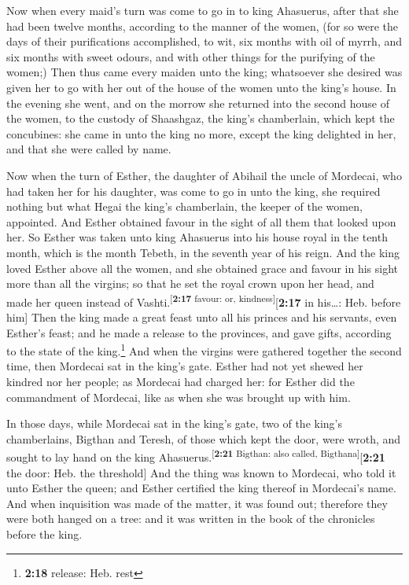  Now when every maid's turn was come to go in to king
Ahasuerus, after that she had been twelve months, according to the
manner of the women, (for so were the days of their purifications
accomplished, to wit, six months with oil of myrrh, and six months with
sweet odours, and with other things for the purifying of the women;)
 Then thus came every maiden unto the king; whatsoever
she desired was given her to go with her out of the house of the women
unto the king's house.  In the evening she went, and on
the morrow she returned into the second house of the women, to the
custody of Shaashgaz, the king's chamberlain, which kept the concubines:
she came in unto the king no more, except the king delighted in her, and
that she were called by name.

 Now when the turn of Esther, the daughter of Abihail the
uncle of Mordecai, who had taken her for his daughter, was come to go in
unto the king, she required nothing but what Hegai the king's
chamberlain, the keeper of the women, appointed. And Esther obtained
favour in the sight of all them that looked upon her.  So
Esther was taken unto king Ahasuerus into his house royal in the tenth
month, which is the month Tebeth, in the seventh year of his reign.
 And the king loved Esther above all the women, and she
obtained grace and favour in his sight more than all the virgins; so
that he set the royal crown upon her head, and made her queen instead of
Vashti.\textsuperscript{{[}\textbf{2:17} favour: or,
kindness{]}}{[}\textbf{2:17} in his\ldots: Heb. before him{]}
 Then the king made a great feast unto all his princes
and his servants, even Esther's feast; and he made a release to the
provinces, and gave gifts, according to the state of the
king.\footnote{\textbf{2:18} release: Heb. rest}  And
when the virgins were gathered together the second time, then Mordecai
sat in the king's gate.  Esther had not yet shewed her
kindred nor her people; as Mordecai had charged her: for Esther did the
commandment of Mordecai, like as when she was brought up with him.

 In those days, while Mordecai sat in the king's gate,
two of the king's chamberlains, Bigthan and Teresh, of those which kept
the door, were wroth, and sought to lay hand on the king
Ahasuerus.\textsuperscript{{[}\textbf{2:21} Bigthan: also called,
Bigthana{]}}{[}\textbf{2:21} the door: Heb. the threshold{]}
 And the thing was known to Mordecai, who told it unto
Esther the queen; and Esther certified the king thereof in Mordecai's
name.  And when inquisition was made of the matter, it
was found out; therefore they were both hanged on a tree: and it was
written in the book of the chronicles before the king.

